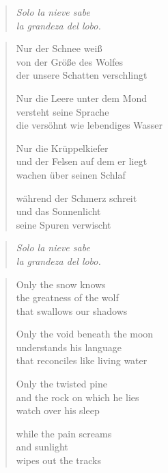 
\cleartoverso


\begin{quote}
\itshape
Solo la nieve sabe\\
la grandeza del lobo.

\end{quote}

\begin{verse}
Nur der Schnee weiß\\
von der Größe des Wolfes\\
der unsere Schatten verschlingt

Nur die Leere unter dem Mond\\
versteht seine Sprache\\
die versöhnt wie lebendiges Wasser

Nur die Krüppelkiefer\\
und der Felsen auf dem er liegt\\
wachen über seinen Schlaf

während der Schmerz schreit\\
und das Sonnenlicht\\
seine Spuren verwischt
\end{verse}

\cleartorecto


\begin{quote}
\itshape
Solo la nieve sabe\\
la grandeza del lobo.

\end{quote}

\begin{verse}
Only the snow knows\\
the greatness of the wolf\\
that swallows our shadows

Only the void beneath the moon\\
understands his language\\
that reconciles like living water

Only the twisted pine\\
and the rock on which he lies\\
watch over his sleep

while the pain screams\\
and sunlight\\
wipes out the tracks
\end{verse}
